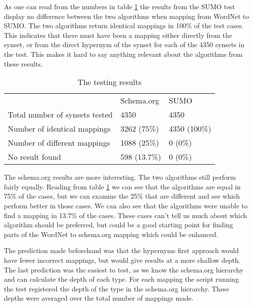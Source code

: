 As one can read from the numbers in table \ref{table:AlgorithmResults} the results from the SUMO test
display no difference between the two algorithms when mapping from WordNet to SUMO.
The two algorithms return identical mappings in 100\% of the test cases.
This indicates that there must have been a mapping either directly from the synset,
or from the direct hypernym of the synset for each of the 4350 synsets in the test.
This makes it hard to say anything relevant about the algorithms from these results.

\begin{table}[ht] %
	\centering
	\begin{tabular}{lll}
										& Schema.org	& SUMO			\\
		Total number of synsets tested 	& 4350			& 4350			\\
		Number of identical mappings 	& 3262 (75\%)	& 4350 (100\%)	\\
		Number  of different mappings	& 1088 (25\%)	& 0	(0\%)		\\
		No result found					& 598  (13.7\%)	& 0	(0\%)
	\end{tabular}
	\caption{The testing results}
	\label{table:AlgorithmResults}
\end{table}

The schema.org results are more interesting.
The two algorithms still perform fairly equally.
Reading from table \ref{table:AlgorithmResults} we can see that the algorithms are equal in 75\% of the cases,
but we can examine the 25\% that are different and see which perform better in those cases.
We can also see that the algorithms were unable to find a mapping in 13.7\% of the cases.
These cases can't tell us much about which algorithm should be preferred,
but could be a good starting point for finding parts of the WordNet to schema.org mapping which could be enhanced.

The prediction made beforehand was that the hypernyms first approach would have fewer incorrect mappings,
but would give results at a more shallow depth.
The last prediction was the easiest to test, as we know the schema.org hierarchy and can calculate the depth of each type.
For each mapping the script running the test registered the depth of the type in the schema.org hierarchy.
These depths were averaged over the total number of mappings made.

